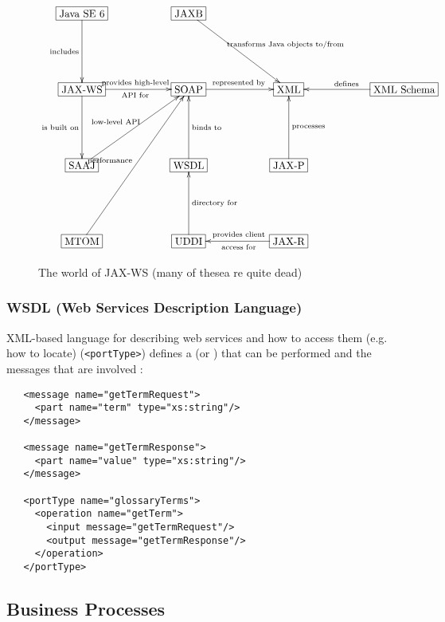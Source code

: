 \documentclass{myproc}
\begin{document}
\begin{figure*}[ht]
\small
\[\xymatrix@+3pc{
  *+[F]\txt{Java SE 6} \ar[d]_{\mbox{\scriptsize{}includes}} & *+[F]\txt{JAXB} \ar[dr]^{\mbox{\scriptsize{}transforms Java objects to/from}}& & \\ 
 *+[F]\txt{JAX-WS} \ar[r]^{\mbox{\scriptsize{}provides high-level}}_{\mbox{\scriptsize{}API for}} \ar[d]_{\mbox{\scriptsize{}is built on}} & *+[F]\txt{SOAP} \ar[r]^{\mbox{\scriptsize{}represented by}} & *+[F]\txt{XML} & *+[F]\txt{XML Schema} \ar[l]_{\mbox{\scriptsize{}defines}}\\ 
  *+[F]\txt{SAAJ} \ar[ur]^{\mbox{\scriptsize{}low-level API}} & *+[F]\txt{WSDL} \ar[u]_{\mbox{\scriptsize{}binds to}} & *+[F]\txt{JAX-P} \ar[u]_{\mbox{\scriptsize{}processes}}& \\
  *+[F]\txt{MTOM} \ar[uur]^{\mbox{\scriptsize{}performance}} & *+[F]\txt{UDDI}\ar[u]_{\mbox{\scriptsize{}directory for}} & *+[F]\txt{JAX-R} \ar[l]_{\mbox{\scriptsize{}provides client}}^{\mbox{\scriptsize{}access for}}&
}\]
\caption{The world of JAX-WS (many of thesea re quite dead)}
\end{figure*}

\subsubsection{WSDL (Web Services Description Language)}
\bit
\w XML-based language for describing web services and how to access them
(e.g. how to locate)
\w {} (\verb+<portType>+)
  \bit
  \w defines a  (or ) that can be performed and
  the messages that are involved
  \w {}:  
{
\begin{verbatim}
   <message name="getTermRequest">
     <part name="term" type="xs:string"/>
   </message>

   <message name="getTermResponse">
     <part name="value" type="xs:string"/>
   </message>

   <portType name="glossaryTerms">
     <operation name="getTerm">
       <input message="getTermRequest"/>
       <output message="getTermResponse"/>
     </operation>
   </portType>
\end{verbatim}
}
  \eit
\w {}
\w {}
\w {}
\eit

\subsection{Business Processes}
\end{document}
